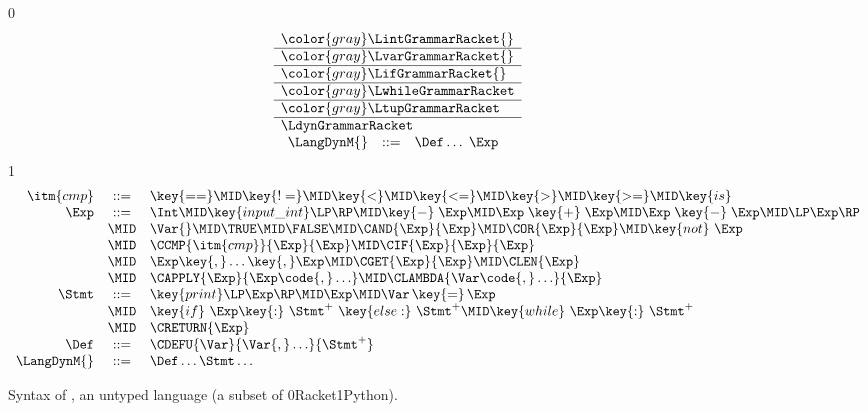 \documentclass[7x10]{TimesAPriori_MIT}%
\newcommand{\gray}[1]{{\color{gray} #1}}
\def\racketEd{0}
\def\pythonEd{1}
\def\edition{1}
\newcommand{\racket}[1]{{\if\edition\racketEd{#1}\fi}}
\newcommand{\pythonColor}[0]{}
\newcommand{\python}[1]{{\if\edition\pythonEd\pythonColor #1\fi}}
\numberwithin{theorem}{chapter}
\numberwithin{definition}{chapter}
\numberwithin{equation}{chapter}
\begin{document}
\begin{figure}[tp]
  \centering
  \begin{tcolorbox}[colback=white]  
    \small
{\if\edition\racketEd    
\[
\begin{array}{l}
  \gray{\LintGrammarRacket{}} \\ \hline
  \gray{\LvarGrammarRacket{}} \\ \hline
  \gray{\LifGrammarRacket{}} \\ \hline
  \gray{\LwhileGrammarRacket} \\ \hline
  \gray{\LtupGrammarRacket} \\ \hline
  \LdynGrammarRacket \\
\begin{array}{rcl}
\LangDynM{}  &::=& \Def\ldots\; \Exp
\end{array}
\end{array}
\]
\fi}
{\if\edition\pythonEd\pythonColor
\[
\begin{array}{rcl}
  \itm{cmp} &::= & \key{==} \MID \key{!=} \MID \key{<} \MID \key{<=} \MID \key{>} \MID \key{>=} \MID \key{is} \\
  \Exp &::=& \Int \MID \key{input\_int}\LP\RP \MID \key{-}\;\Exp \MID \Exp \; \key{+} \; \Exp \MID \Exp \; \key{-} \; \Exp \MID \LP\Exp\RP \\
  &\MID& \Var{} \MID \TRUE \MID \FALSE \MID \CAND{\Exp}{\Exp}
  \MID \COR{\Exp}{\Exp} \MID \key{not}~\Exp \\
  &\MID& \CCMP{\itm{cmp}}{\Exp}{\Exp}
      \MID \CIF{\Exp}{\Exp}{\Exp} \\
  &\MID& \Exp \key{,} \ldots \key{,} \Exp \MID \CGET{\Exp}{\Exp}
      \MID \CLEN{\Exp}  \\
   &\MID& \CAPPLY{\Exp}{\Exp\code{,} \ldots} 
    \MID \CLAMBDA{\Var\code{, }\ldots}{\Exp}\\
  \Stmt &::=& \key{print}\LP \Exp \RP \MID \Exp 
    \MID \Var\mathop{\key{=}}\Exp \\
   &\MID& \key{if}~ \Exp \key{:}~ \Stmt^{+} ~\key{else:}~ \Stmt^{+} 
   \MID \key{while}~ \Exp \key{:}~ \Stmt^{+} \\
    &\MID& \CRETURN{\Exp} \\
   \Def &::=& \CDEFU{\Var}{\Var{,} \ldots}{\Stmt^{+}} \\
  \LangDynM{} &::=& \Def\ldots \Stmt\ldots
\end{array}
\]
\fi}
  \end{tcolorbox}
\caption{Syntax of \LangDyn{}, an untyped language (a subset of \racket{Racket}\python{Python}).}
\label{fig:r7-concrete-syntax}
\end{figure}
\end{document}
